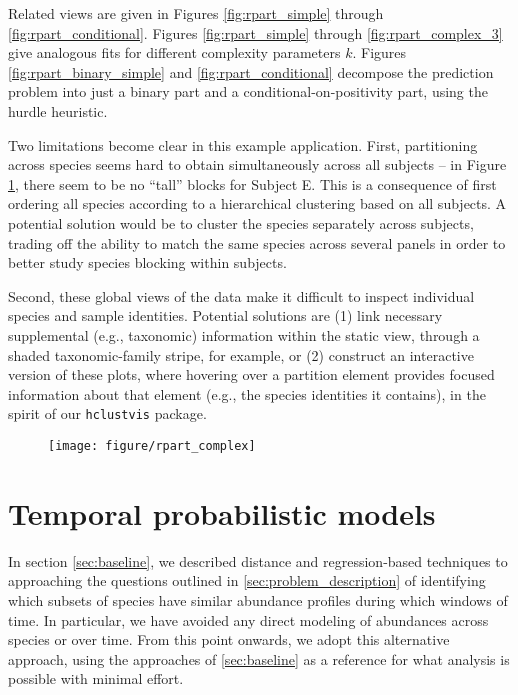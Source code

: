 \documentclass{article}
\begin{document}
Related views are given in Figures \ref{fig:rpart_simple} through
\ref{fig:rpart_conditional}. Figures \ref {fig:rpart_simple} through
\ref{fig:rpart_complex_3} give analogous fits for different complexity
parameters $k$. Figures \ref{fig:rpart_binary_simple} and
\ref{fig:rpart_conditional} decompose the prediction problem into just a binary
part and a conditional-on-positivity part, using the hurdle heuristic.

Two limitations become clear in this example application. First, partitioning
across species seems hard to obtain simultaneously across all subjects -- in
Figure \ref{fig:rpart_complex}, there seem to be no ``tall'' blocks for Subject
E. This is a consequence of first ordering all species according to a
hierarchical clustering based on all subjects. A potential solution would be to
cluster the species separately across subjects, trading off the ability to match
the same species across several panels in order to better study species blocking
within subjects.

Second, these global views of the data make it difficult to inspect individual
species and sample identities. Potential solutions are (1) link necessary
supplemental (e.g., taxonomic) information within the static view, through a
shaded taxonomic-family stripe, for example, or (2) construct an interactive
version of these plots, where hovering over a partition element provides focused
information about that element (e.g., the species identities it contains), in
the spirit of our \texttt{hclustvis} package.

\begin{figure}[ht]
  \centering
  \texttt{[image: figure/rpart\_complex]}
  \caption{\label{fig:rpart_complex} }
\end{figure}

\section{Temporal probabilistic models}
\label{sec:temporal_probabilistic_models}

In section \ref{sec:baseline}, we described distance and regression-based
techniques to approaching the questions outlined in
\ref{sec:problem_description} of identifying which subsets of species have
similar abundance profiles during which windows of time. In particular, we have
avoided any direct modeling of abundances across species or over time. From this
point onwards, we adopt this alternative approach, using the approaches of
\ref{sec:baseline} as a reference for what analysis is possible with minimal
effort.
\end{document}
